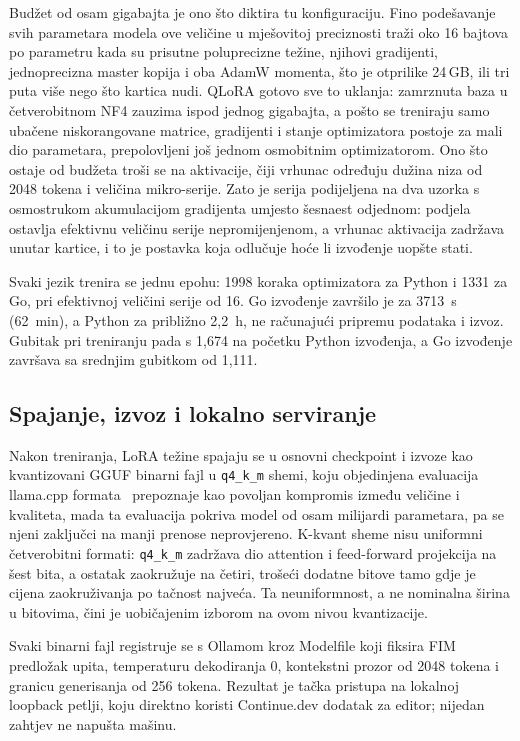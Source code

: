 \documentclass[10pt,conference,a4paper]{IEEEtran}
\begin{document}
Budžet od osam gigabajta je ono što diktira tu konfiguraciju. Fino
podešavanje svih parametara modela ove veličine u mješovitoj preciznosti
traži oko 16 bajtova po parametru kada su prisutne poluprecizne težine,
njihovi gradijenti, jednoprecizna master kopija i oba AdamW momenta, što je
otprilike 24\,GB, ili tri puta više nego što kartica nudi. QLoRA gotovo sve
to uklanja: zamrznuta baza u četverobitnom NF4 zauzima ispod jednog
gigabajta, a pošto se treniraju samo ubačene niskorangovane matrice,
gradijenti i stanje optimizatora postoje za mali dio parametara, prepolovljeni
još jednom osmobitnim optimizatorom. Ono što ostaje od budžeta troši se na
aktivacije, čiji vrhunac određuju dužina niza od 2048 tokena i veličina
mikro-serije. Zato je serija podijeljena na dva uzorka s osmostrukom
akumulacijom gradijenta umjesto šesnaest odjednom: podjela ostavlja efektivnu
veličinu serije nepromijenjenom, a vrhunac aktivacija zadržava unutar
kartice, i to je postavka koja odlučuje hoće li izvođenje uopšte stati.

Svaki jezik trenira se jednu epohu: 1998 koraka optimizatora za Python i 1331
za Go, pri efektivnoj veličini serije od 16. Go izvođenje završilo je za
3713~s (62~min), a Python za približno 2,2~h, ne računajući pripremu podataka
i izvoz. Gubitak pri treniranju pada s 1,674 na početku
Python izvođenja, a Go izvođenje završava sa srednjim gubitkom od 1,111.

\subsection{Spajanje, izvoz i lokalno serviranje}
Nakon treniranja, LoRA težine spajaju se u osnovni checkpoint i izvoze kao
kvantizovani GGUF binarni fajl u \texttt{q4\_k\_m} shemi, koju objedinjena
evaluacija llama.cpp formata~\cite{kurt2026} prepoznaje kao povoljan
kompromis između veličine i kvaliteta, mada ta evaluacija pokriva model od
osam milijardi parametara, pa se njeni zaključci na manji prenose
neprovjereno. K-kvant sheme nisu uniformni četverobitni formati:
\texttt{q4\_k\_m} zadržava dio attention i feed-forward projekcija na šest
bita, a ostatak zaokružuje na četiri, trošeći dodatne bitove tamo gdje je
cijena zaokruživanja po tačnost najveća. Ta neuniformnost, a ne nominalna
širina u bitovima, čini je uobičajenim izborom na ovom nivou kvantizacije.

Svaki binarni fajl registruje se s Ollamom kroz Modelfile koji fiksira FIM
predložak upita, temperaturu dekodiranja 0, kontekstni prozor od 2048 tokena i
granicu generisanja od 256 tokena. Rezultat je tačka pristupa na lokalnoj
loopback petlji, koju direktno koristi Continue.dev dodatak za editor; nijedan
zahtjev ne napušta mašinu.
\end{document}

